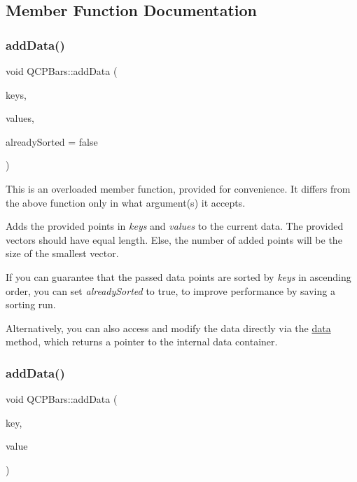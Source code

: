 \subsection{Member Function Documentation}
\mbox{\label{class_q_c_p_bars_a323d6970d6d6e3166d89916a7f60f733}} 
\subsubsection{\texorpdfstring{addData()}{addData()}\hspace{0.1cm}{\footnotesize\ttfamily [1/2]}}
{\footnotesize\ttfamily void Q\+C\+P\+Bars\+::add\+Data (\begin{DoxyParamCaption}\item[{const Q\+Vector$<$ double $>$ \&}]{keys,  }\item[{const Q\+Vector$<$ double $>$ \&}]{values,  }\item[{bool}]{already\+Sorted = {\ttfamily false} }\end{DoxyParamCaption})}

This is an overloaded member function, provided for convenience. It differs from the above function only in what argument(s) it accepts.

Adds the provided points in {\itshape keys} and {\itshape values} to the current data. The provided vectors should have equal length. Else, the number of added points will be the size of the smallest vector.

If you can guarantee that the passed data points are sorted by {\itshape keys} in ascending order, you can set {\itshape already\+Sorted} to true, to improve performance by saving a sorting run.

Alternatively, you can also access and modify the data directly via the \mbox{\hyperlink{class_q_c_p_bars_a7e373a534d82e18ed27b3fafd1f08fae}{data}} method, which returns a pointer to the internal data container. \mbox{\label{class_q_c_p_bars_a684dd105403a5497fda42f2094fecbb7}} 
\subsubsection{\texorpdfstring{addData()}{addData()}\hspace{0.1cm}{\footnotesize\ttfamily [2/2]}}
{\footnotesize\ttfamily void Q\+C\+P\+Bars\+::add\+Data (\begin{DoxyParamCaption}\item[{double}]{key,  }\item[{double}]{value }\end{DoxyParamCaption})}

